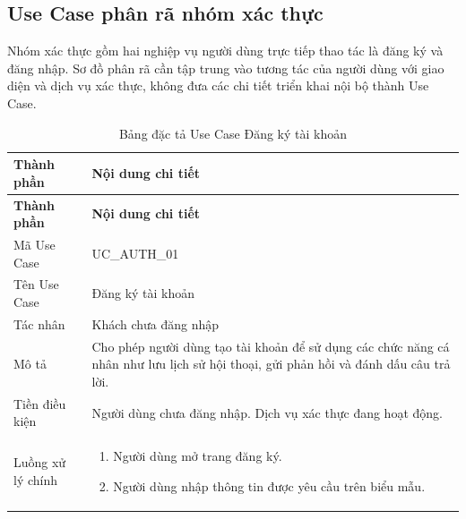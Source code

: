 \documentclass[12pt,a4paper,oneside]{report}
\begin{document}
\subsection{Use Case phân rã nhóm xác thực}
Nhóm xác thực gồm hai nghiệp vụ người dùng trực tiếp thao tác là đăng ký và đăng nhập. Sơ đồ phân rã cần tập trung vào tương tác của người dùng với giao diện và dịch vụ xác thực, không đưa các chi tiết triển khai nội bộ thành Use Case.
{
  \begin{longtable}{|L{3.6cm}|L{11.2cm}|}
    \caption{Bảng đặc tả Use Case Đăng ký tài khoản}\label{tab:uc-register}                                                                                 \\
    \hline
    \textbf{Thành phần} & \textbf{Nội dung chi tiết}                                                                                                          \\
    \hline
    \endfirsthead
    \hline
    \textbf{Thành phần} & \textbf{Nội dung chi tiết}                                                                                                          \\
    \hline
    \endhead
    Mã Use Case       & UC\_AUTH\_01                                                                                                                        \\
    \hline
    Tên Use Case      & Đăng ký tài khoản                                                                                                                   \\
    \hline
    Tác nhân            & Khách chưa đăng nhập                                                                                                                \\
    \hline
    Mô tả               & Cho phép người dùng tạo tài khoản để sử dụng các chức năng cá nhân như lưu lịch sử hội thoại, gửi phản hồi và đánh dấu câu trả lời. \\
    \hline
    Tiền điều kiện      & Người dùng chưa đăng nhập. Dịch vụ xác thực đang hoạt động.                                                                         \\
    \hline
    Luồng xử lý chính   & \begin{enumerate}[leftmargin=*,nosep]
                            \item Người dùng mở trang đăng ký.
                            \item Người dùng nhập thông tin được yêu cầu trên biểu mẫu.

\end{enumerate}
\end{longtable}}
\end{document}
